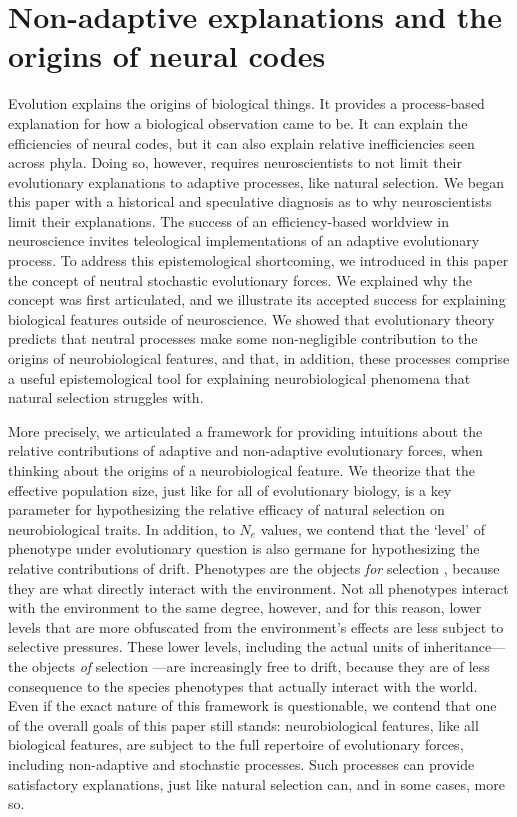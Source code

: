 \documentclass[twocolumn]{article}
\begin{document}
\section{Non-adaptive explanations and the origins of neural codes}

Evolution explains the origins of biological things. It provides a process-based explanation for how a biological observation came to be. It can explain the efficiencies of neural codes, but it can also explain relative inefficiencies seen across phyla. Doing so, however, requires neuroscientists to not limit their evolutionary explanations to adaptive processes, like natural selection. We began this paper with a historical and speculative diagnosis as to why neuroscientists limit their explanations. The success of an efficiency-based worldview in neuroscience invites teleological implementations of an adaptive evolutionary process. To address this epistemological shortcoming, we introduced in this paper the concept of neutral stochastic evolutionary forces. We explained why the concept was first articulated, and we illustrate its accepted success for explaining biological features outside of neuroscience. We showed that evolutionary theory predicts that neutral processes make some non-negligible contribution to the origins of neurobiological features, and that, in addition, these processes comprise a useful epistemological tool for explaining neurobiological phenomena that natural selection struggles with. 

More precisely, we articulated a framework for providing intuitions about the relative contributions of adaptive and non-adaptive evolutionary forces, when thinking about the origins of a neurobiological feature. We theorize that the effective population size, just like for all of evolutionary biology, is a key parameter for hypothesizing the relative efficacy of natural selection on neurobiological traits. In addition, to $N_e$ values, we contend that the `level' of phenotype under evolutionary question is also germane for hypothesizing the relative contributions of drift. Phenotypes are the objects \textit{for} selection \cite{mayr_1997, sober1993nature}, because they are what directly interact with the environment. Not all phenotypes interact with the environment to the same degree, however, and for this reason, lower levels that are more obfuscated from the environment's effects are less subject to selective pressures. These lower levels, including the actual units of inheritance---the objects \textit{of} selection \cite{mayr_1997, sober1993nature}---are increasingly free to drift, because they are of less consequence to the species phenotypes that actually interact with the world. Even if the exact nature of this framework is questionable, we contend that one of the overall goals of this paper still stands: neurobiological features, like all biological features, are subject to the full repertoire of evolutionary forces, including non-adaptive and stochastic processes. Such processes can provide satisfactory explanations, just like natural selection can, and in some cases, more so. 
\end{document}

